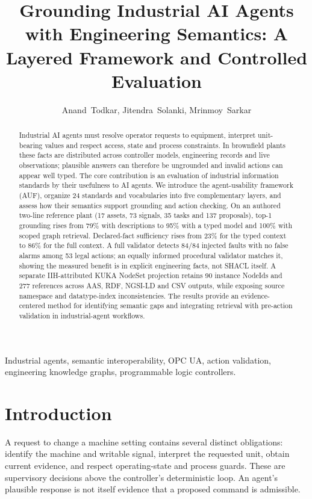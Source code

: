 \documentclass[10pt,journal,letterpaper]{IEEEtran}
\begin{document}
\title{Grounding Industrial AI Agents with Engineering Semantics: A Layered Framework and Controlled Evaluation}
\author{Anand~Todkar, Jitendra~Solanki, Mrinmoy~Sarkar}
\maketitle
\begin{abstract}
Industrial AI agents must resolve operator requests to equipment, interpret
unit-bearing values and respect access, state and process constraints. In
brownfield plants these facts are distributed across controller models,
engineering records and live observations; plausible answers can therefore be
ungrounded and invalid actions can appear well typed. The core contribution is
an evaluation of industrial information standards by their usefulness to AI
agents. We introduce the agent-usability framework (AUF), organize 24 standards
and vocabularies into five complementary layers, and assess how their semantics
support grounding and action checking. On an authored two-line reference plant (17 assets,
73 signals, 35 tasks and 137 proposals), top-1 grounding rises from 79\% with
descriptions to 95\% with a typed model and 100\% with scoped graph retrieval.
Declared-fact sufficiency rises from 23\% for the typed context to 86\% for the
full context. A full validator detects 84/84 injected faults with no false alarms
among 53 legal actions; an equally informed procedural validator matches it,
showing the measured benefit is in explicit engineering facts, not SHACL itself.
A separate IIH-attributed KUKA NodeSet projection retains 90 instance NodeIds
and 277 references across AAS, RDF, NGSI-LD and CSV outputs, while exposing
source namespace and datatype-index inconsistencies. The results provide an
evidence-centered method for identifying semantic gaps and integrating retrieval
with pre-action validation in industrial-agent workflows.
\end{abstract}
\begin{IEEEkeywords}
Industrial agents, semantic interoperability, OPC UA, action validation,
engineering knowledge graphs, programmable logic controllers.
\end{IEEEkeywords}

\section{Introduction}
A request to change a machine setting contains several distinct obligations:
identify the machine and writable signal, interpret the requested unit, obtain
current evidence, and respect operating-state and process guards. These are
supervisory decisions above the controller's deterministic loop. An agent's
plausible response is not itself evidence that a proposed command is admissible.
\end{document}
